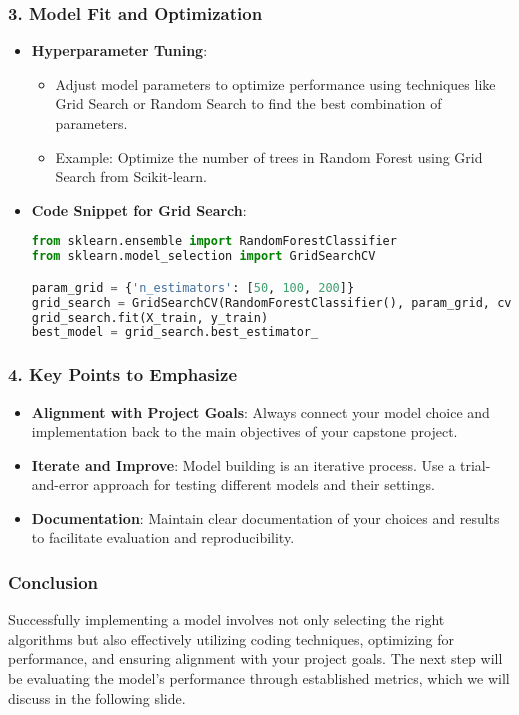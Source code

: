 \documentclass[aspectratio=169]{beamer}
\begin{document}
\begin{frame}[fragile]
    \frametitle{3. Model Fit and Optimization}
    \begin{itemize}
        \item \textbf{Hyperparameter Tuning}:
        \begin{itemize}
            \item Adjust model parameters to optimize performance using techniques like Grid Search or Random Search to find the best combination of parameters.
            \item Example: Optimize the number of trees in Random Forest using Grid Search from Scikit-learn.
        \end{itemize}
        
        \item \textbf{Code Snippet for Grid Search}:
        \begin{lstlisting}[language=Python]
from sklearn.ensemble import RandomForestClassifier
from sklearn.model_selection import GridSearchCV

param_grid = {'n_estimators': [50, 100, 200]}
grid_search = GridSearchCV(RandomForestClassifier(), param_grid, cv=5)
grid_search.fit(X_train, y_train)
best_model = grid_search.best_estimator_
        \end{lstlisting}
    \end{itemize}
\end{frame}

\begin{frame}
    \frametitle{4. Key Points to Emphasize}
    \begin{itemize}
        \item \textbf{Alignment with Project Goals}: Always connect your model choice and implementation back to the main objectives of your capstone project.
        \item \textbf{Iterate and Improve}: Model building is an iterative process. Use a trial-and-error approach for testing different models and their settings.
        \item \textbf{Documentation}: Maintain clear documentation of your choices and results to facilitate evaluation and reproducibility.
    \end{itemize}
\end{frame}

\begin{frame}
    \frametitle{Conclusion}
    Successfully implementing a model involves not only selecting the right algorithms but also effectively utilizing coding techniques, optimizing for performance, and ensuring alignment with your project goals. The next step will be evaluating the model's performance through established metrics, which we will discuss in the following slide.
\end{frame}
\end{document}
